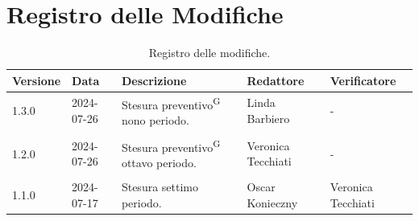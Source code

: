 \documentclass[8pt]{article}
\newcommand{\glossterm}[1]{#1\textsuperscript{G}} %
\begin{document}
\section*{Registro delle Modifiche}
\begin{table}[ht!]	
	\centering
	\begin{tabular}{p{1.2cm} p{2cm} p{5cm} p{3cm} p{3cm}}
		\toprule
		\textbf{Versione}& \textbf{Data} & \textbf{Descrizione} & \textbf{Redattore} & \textbf{Verificatore} \\
		\midrule
            1.3.0 & 2024-07-26 & Stesura \glossterm{preventivo} nono periodo. & Linda Barbiero & -
 		    \\\\
            1.2.0 & 2024-07-26 & Stesura \glossterm{preventivo} ottavo periodo. & Veronica Tecchiati & -
 		    \\\\
			1.1.0 & 2024-07-17 & Stesura settimo periodo. & Oscar Konieczny & Veronica Tecchiati
 		    \\ %
		\bottomrule
	\end{tabular}
	\caption{Registro delle modifiche.}
	\label{table:Registro delle modifiche}
\end{table}
\clearpage
\end{document}
